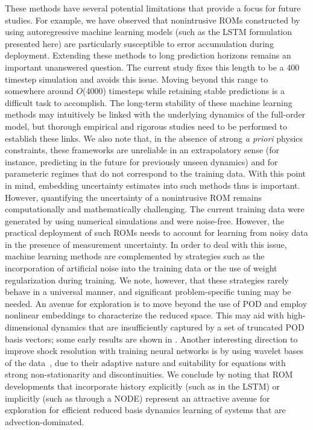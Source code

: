 \documentclass[preprint,12pt]{elsarticle}
\begin{document}
These methods have several potential limitations that provide a focus for future studies. For example, we have observed that nonintrusive ROMs constructed by using autoregressive machine learning models (such as the LSTM formulation presented here) are particularly susceptible to error accumulation during deployment. Extending these methods to long prediction horizons remains an important unanswered question. The current study fixes this length to be a 400 timestep simulation and avoids this issue. Moving beyond this range to somewhere around $O$(4000) timesteps while retaining stable predictions is a difficult task to accomplish. The long-term stability of these machine learning methods may intuitively be linked with the underlying dynamics of the full-order model, but thorough empirical and rigorous studies need to be performed to establish these links. We also note that, in the absence of strong \textit{a priori} physics constraints, these frameworks are unreliable in an extrapolatory sense (for instance, predicting in the future for previously unseen dynamics) and for parameteric regimes that do not correspond to the training data. With this point in mind,  embedding uncertainty estimates into such methods thus is important. However, quantifying the uncertainty of a nonintrusive ROM remains computationally and mathematically challenging. The current training data were generated by using numerical simulations and were noise-free. However, the practical deployment of such ROMs needs to account for learning from noisy data in the presence of measurement uncertainty. In order to deal with this issue, machine learning methods are complemented by strategies such as the incorporation of artificial noise into the training data or  the use of weight regularization during training. We note, however,  that these strategies rarely behave in a universal manner, and significant problem-specific tuning may  be needed. An avenue for exploration is to move beyond the use of POD and employ nonlinear embeddings to characterize the reduced space. This may aid with high-dimensional dynamics that are insufficiently captured by a set of truncated POD basis vectors; some early results are shown in \cite{lee2019model}. Another interesting direction to improve shock resolution with training neural networks is by using wavelet bases of the data~\cite{mohanwavelet}, due to their adaptive nature and suitability for equations with strong non-stationarity and discontinuities. We conclude by noting that ROM developments that incorporate history explicitly (such as in the LSTM) or implicitly (such as through a NODE) represent an attractive avenue for exploration for efficient reduced basis dynamics learning of systems that are advection-dominated.
\end{document}
